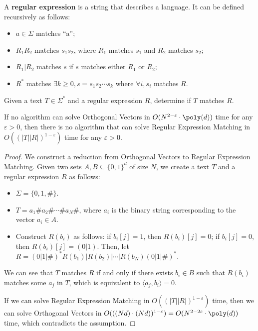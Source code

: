 \begin{problem}
A \textbf{regular expression} is a string that describes a language. It can be defined recursively as follows:
\begin{itemize}
	\item $a\in \Sigma$ matches ``a'';
	\item $R_1R_2$ matches $s_1s_2$, where $R_1$ matches $s_1$ and $R_2$ matches $s_2$;
	\item $R_1|R_2$ matches $s$ if $s$ matches either $R_1$ or $R_2$;
	\item $R^*$ matches $\exists k \ge 0, s = s_1s_2\cdots s_k$ where $\forall i, s_i$ matches $R$.
\end{itemize}
Given a text $T \in \Sigma^*$ and a regular expression $R$, determine if $T$ matches $R$.
\end{problem}
\begin{theorem}
	If no algorithm can solve Orthogonal Vectors in $O(N^{2-\varepsilon} \cdot \poly(d))$ time for any $\varepsilon > 0$, then there is no algorithm that can solve Regular Expression Matching in $O((|T||R|)^{1-\varepsilon})$ time for any $\varepsilon > 0$.
\end{theorem}
\begin{proof}
	We construct a reduction from Orthogonal Vectors to Regular Expression Matching. Given two sets $A, B \subseteq \{0, 1\}^d$ of size $N$, we create a text $T$ and a regular expression $R$ as follows:
	\begin{itemize}
		\item $\Sigma = \{0, 1, \#\}$.
		\item $T = a_1\#a_2\#\cdots \#a_N\#$, where $a_i$ is the binary string corresponding to the vector $a_i \in A$.
		\item Construct $R(b_i)$ as follows: if $b_i[j] = 1$, then $R(b_i)[j] = 0$; if $b_i[j] = 0$, then $R(b_i)[j] = (0|1)$. Then, let $R = (0|1|\#)^*R(b_1)|R(b_2)|\cdots |R(b_N)(0|1|\#)^*$.
	\end{itemize}
	We can see that $T$ matches $R$ if and only if there exists $b_i \in B$ such that $R(b_i)$ matches some $a_j$ in $T$, which is equivalent to $\langle a_j, b_i \rangle = 0$.

	If we can solve Regular Expression Matching in $O((|T||R|)^{1-\varepsilon})$ time, then we can solve Orthogonal Vectors in $O(((Nd) \cdot (Nd))^{1-\varepsilon}) = O(N^{2-2\varepsilon} \cdot \poly(d))$ time, which contradicts the assumption.
\end{proof}
